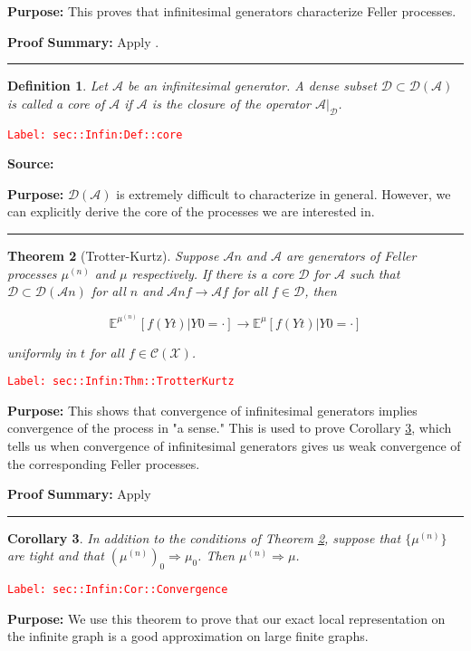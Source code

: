 \documentclass[12pt]{article}
\newcommand{\mb}{\mathbb}
\newcommand{\mc}{\mathcal}
\newcommand{\ra}{\rightarrow}
\newcommand{\tr}{\textcolor{red}}
\newcommand{\labe}[1]{\tr{\texttt{Label: #1}}}
\newcommand{\purpose}{\textbf{Purpose: }}
\newcommand{\pfsum}{\textbf{Proof Summary: }}
\newcommand{\lin}{\rule{\linewidth}{0.4 pt}}
\newcommand{\exmu}[2]{\mb{E}^{#1}\left[#2\right]}	%
\renewcommand{\t}{t}							%
\newcommand{\IG}{\mc{A}}						%
\newcommand{\ts}[1]{_{#1}}						%
\newcommand{\sln}[1]{^{(#1)}}					%
\newcommand{\core}{\mc{D}}						%
\newcommand{\cont}{\mc{C}}						%
\newcommand{\m}{\mu}							%
\newcommand{\XX}{Y}								%
\newcommand{\spce}{\mc{X}}						%
\newtheorem{thms}{Theorem}[section]
\newtheorem{coro}[thms]{Corollary}
\newtheorem{defn}[thms]{Definition}
\begin{document}
\purpose This proves that infinitesimal generators characterize Feller processes.

\pfsum Apply \cite[Theorem 1.5,2.9]{Lig85}.

\lin

\begin{defn}
Let \(\IG{}\) be an infinitesimal generator. A dense subset \(\core\subset \core(\IG{})\) is called a core of \(\IG{}\) if \(\IG{}\) is the closure of the operator \(\IG{}|_\core\).
\label{sec::Infin:Def::core}
\end{defn}
\labe{sec::Infin:Def::core}

\textbf{Source: }\cite[Definition 2.11]{Lig85}

\purpose \(\core(\IG{})\) is extremely difficult to characterize in general. However, we can explicitly derive the core of the processes we are interested in.

\lin

\begin{thms}[Trotter-Kurtz]
Suppose \(\IG{n}\) and \(\IG{}\) are generators of Feller processes \(\m\sln{n}\) and \(\m\) respectively. If there is a core \(\core\) for \(\IG{}\) such that \(\core \subset \mc{D}(\IG{n})\) for all \(n\) and \(\IG{n} f \ra \IG{} f\) for all \(f \in \core\), then 

\[\exmu{\m\sln{n}}{f(\XX{}{\t})|\XX{}{0}=\cdot} \ra \exmu{\mu}{f(\XX{}{\t})|\XX{}{0}=\cdot}\]

uniformly in \(\t\) for all \(f \in \cont(\spce)\).
\label{sec::Infin:Thm::TrotterKurtz}
\end{thms}
\labe{sec::Infin:Thm::TrotterKurtz}

\purpose This shows that convergence of infinitesimal generators implies convergence of the process in "a sense." This is used to prove Corollary \ref{sec::Infin:Cor::Convergence}, which tells us when convergence of infinitesimal generators gives us weak convergence of the corresponding Feller processes.

\pfsum Apply \cite[Theorem 2.12]{Lig85}

\lin

\begin{coro}
In addition to the conditions of Theorem \ref{sec::Infin:Thm::TrotterKurtz}, suppose that \(\{\m\sln{n}\}\) are tight and that \((\m\sln{n})\ts{0} \Rightarrow \m\ts{0}\). Then \(\m\sln{n} \Rightarrow \m\).
\label{sec::Infin:Cor::Convergence}
\end{coro}
\labe{sec::Infin:Cor::Convergence}

\purpose We use this theorem to prove that our exact local representation on the infinite graph is a good approximation on large finite graphs.
\end{document}
